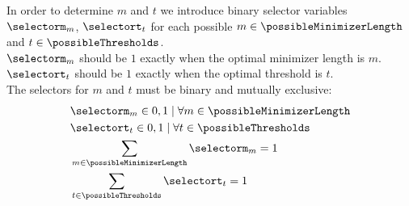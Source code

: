In order to determine $m$ and $t$ we introduce binary selector variables $\selectorm_m$, $\selectort_t$ for each possible $m \in \possibleMinimizerLength$ and $t \in \possibleThresholds$.\\
$\selectorm_m$ should be $1$ exactly when the optimal minimizer length is $m$.\\
$\selectort_t$ should be $1$ exactly when the optimal threshold is $t$.\\
The selectors for $m$ and $t$ must be binary and mutually exclusive:
\begin{align*}
	&\selectorm_m \in {0,1} \mid \forall m \in \possibleMinimizerLength \\
	&\selectort_t \in {0,1} \mid \forall t \in \possibleThresholds \\
	&\sum_{m \in \possibleMinimizerLength} \selectorm_m = 1 \\
	&\sum_{t \in \possibleThresholds} \selectort_t = 1
\end{align*}

